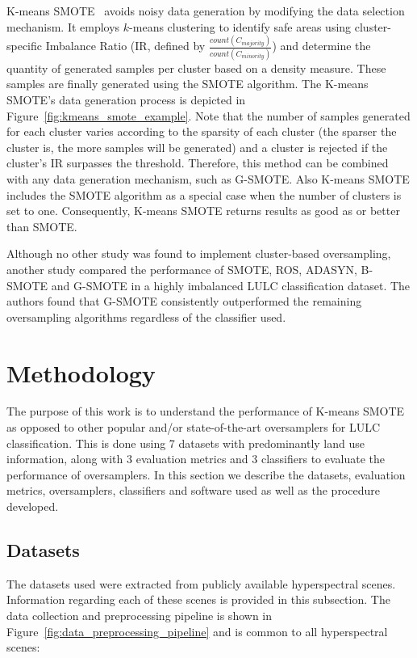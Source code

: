 \documentclass[information,article,submit,moreauthors,pdftex]{Definitions/mdpi}
\begin{document}
\begin{paracol}{2}
\linenumbers
\switchcolumn

K-means SMOTE~\citep{Douzas2018} avoids noisy data generation by modifying the
data selection mechanism. It employs $k$-means clustering to identify safe
areas using cluster-specific Imbalance Ratio (IR, defined by
$\frac{count(C_{majority})}{count(C_{minority})}$) and determine the quantity
of generated samples per cluster based on a density measure. These samples are
finally generated using the SMOTE algorithm. The K-means SMOTE's data
generation process is depicted in Figure~\ref{fig:kmeans_smote_example}. Note
that the number of samples generated for each cluster varies according to the
sparsity of each cluster (the sparser the cluster is, the more samples will be
generated) and a cluster is rejected if the cluster's IR surpasses the
threshold.  Therefore, this method can be combined with any data generation
mechanism, such as G-SMOTE.  Also K-means SMOTE includes the SMOTE algorithm
as a special case when the number of clusters is set to one. Consequently,
K-means SMOTE returns results as good as or better than SMOTE.

Although no other study was found to implement cluster-based oversampling,
another study \citep{Douzas2019rs} compared the performance of SMOTE, ROS,
ADASYN, B-SMOTE and G-SMOTE in a highly imbalanced LULC classification dataset.
The authors found that G-SMOTE consistently outperformed the remaining
oversampling algorithms regardless of the classifier used.

\section{Methodology}\label{sec:methodology}

The purpose of this work is to understand the performance of K-means SMOTE as
opposed to other popular and/or state-of-the-art oversamplers for LULC
classification. This is done using 7 datasets with predominantly land use
information, along with 3 evaluation metrics and 3 classifiers to evaluate the
performance of oversamplers. In this section we describe the datasets,
evaluation metrics, oversamplers, classifiers and software used as well as the
procedure developed.

\subsection{Datasets}

The datasets used were extracted from publicly available hyperspectral scenes.
Information regarding each of these scenes is provided in this subsection.
The data collection and preprocessing pipeline is shown in
Figure~\ref{fig:data_preprocessing_pipeline} and is common to all
hyperspectral scenes:


\end{paracol}
\end{document}
